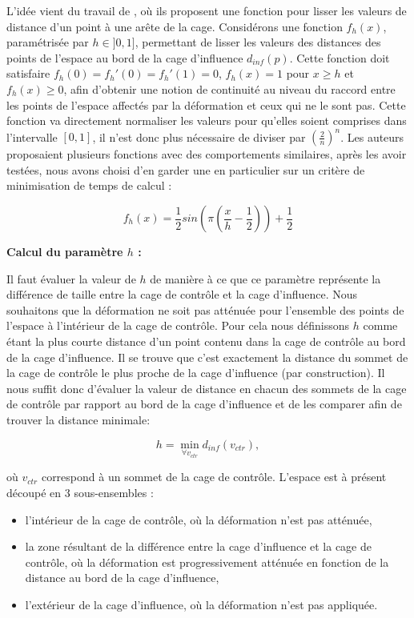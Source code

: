 L'idée vient du travail de \cite{GPCP13}, où ils proposent une fonction pour
lisser les valeurs de distance d'un point à une arête de la cage. Considérons
une fonction $f_h(x)$, paramétrisée par $h \in ]0, 1]$, permettant de lisser
les valeurs des distances des points de l'espace au bord de la cage
d'influence $d_{inf}(p)$. Cette fonction doit satisfaire $f_h(0) = f_h'(0) =
f_h'(1) = 0$, $f_h(x)=1$ pour $x \geq h$ et $f_h(x) \geq 0$, afin d'obtenir
une notion de continuité au niveau du raccord entre les points de l'espace
affectés par la déformation et ceux qui ne le sont pas. Cette fonction va
directement normaliser les valeurs pour qu'elles soient comprises dans
l'intervalle $[0,1]$, il n'est donc plus nécessaire de diviser par
$(\frac{2}{n})^n$. Les auteurs proposaient plusieurs fonctions avec des
comportements similaires, après les avoir testées, nous avons choisi d'en
garder une en particulier sur un critère de minimisation de temps de calcul :

\begin{equation}
  f_h(x) = \frac{1}{2} sin(\pi(\frac{x}{h} - \frac{1}{2})) + \frac{1}{2}
\end{equation}

\textbf{Calcul du paramètre $h$ :}

Il faut évaluer la valeur de $h$ de manière à ce que ce paramètre représente
la différence de taille entre la cage de contrôle et la cage d'influence. Nous
souhaitons que la déformation ne soit pas atténuée pour l'ensemble des points
de l'espace à l'intérieur de la cage de contrôle. Pour cela nous définissons
$h$ comme étant la plus courte distance d'un point contenu dans la cage de
contrôle au bord de la cage d'influence. Il se trouve que c'est exactement la
distance du sommet de la cage de contrôle le plus proche de la cage
d'influence (par construction). Il nous suffit donc d'évaluer la valeur de
distance en chacun des sommets de la cage de contrôle par rapport au bord de
la cage d'influence et de les comparer afin de trouver la distance minimale:

\begin{equation}
  h = \min_{\forall v_{ctr}} d_{inf}(v_{ctr}),
\end{equation}

où $v_{ctr}$ correspond à un sommet de la cage de contrôle. L'espace est à
présent découpé en 3 sous-ensembles : 

\begin{itemize}

\item l'intérieur de la cage de contrôle, où la déformation n'est pas atténuée,

\item la zone résultant de la différence entre la cage d'influence et la cage
de contrôle, où la déformation est progressivement atténuée en fonction de la
distance au bord de la cage d'influence,

\item l'extérieur de la cage d'influence, où la déformation n'est pas
appliquée.

\end{itemize}

